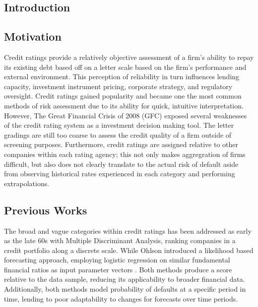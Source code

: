 \documentclass[10pt]{article}
\begin{document}
\begin{multicols*}{2}

\section{Introduction}\label{introduction}
 
\subsection{Motivation}\label{motivation}

Credit ratings provide a relatively objective assessment of a firm's ability to repay its existing debt based off on a letter scale based on the firm's performance and external environment. This perception of reliability in turn influences lending capacity, investment instrument pricing, corporate strategy, and regulatory oversight. 
Credit ratings gained popularity and became one the most common methods of risk assessment due to its ability for quick, intuitive interpretation. However, The Great Financial Crisis of 2008 (GFC) exposed several weaknesses of the credit rating system as a investment decision making tool. The letter gradings are still too coarse to assess the credit quality of a firm outside of screening purposes.
Furthermore, credit ratings are assigned relative to other companies within each rating agency; this not only makes aggregration of firms difficult, but also does not clearly translate to the actual risk of default aside from observing historical rates experienced in each category and performing extrapolations. 

\subsection{Previous Works}\label{lit-review}

The broad and vague categories within credit ratings has been addressed as early as the late 60s with Multiple Discriminant Analysis, ranking companies in a credit portfolio along a discrete scale\citep{altman}. While Ohlson introduced a likelihood based forecasting approach, employing logistic regression on similar fundamental financial ratios as input parameter vectors \citep{ohlson}. 
Both methods produce a score relative to the data sample, reducing its applicability to broader financial data. Additionally, both methods model probability of defaults at a specific period in time, lending to poor adaptability to changes for forecasts over time periods.


\end{multicols*}
\end{document}
